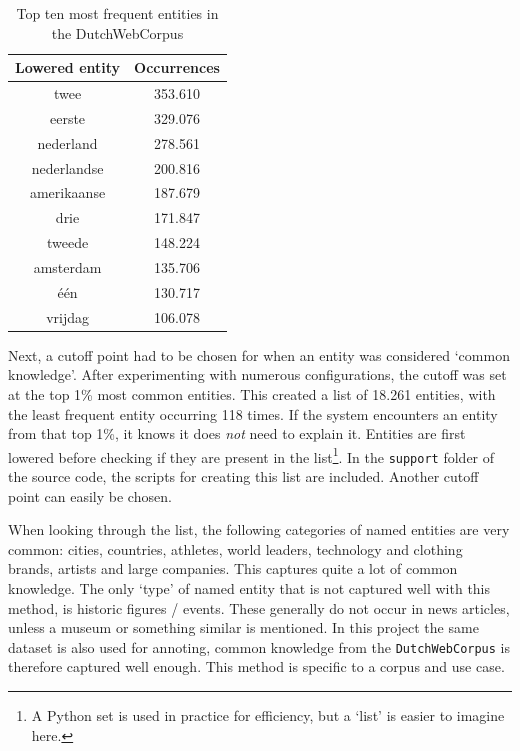 \documentclass[
10pt, %
a4paper, %
oneside, %
headinclude,footinclude, %
] {book}%
\begin{document}
\begin{table}[hbtp]\centering
  \caption{Top ten most frequent entities in the DutchWebCorpus\label{table:entity_counts}}
  \begin{tabular}{cc}
    Lowered entity & Occurrences \\
    \hline
    twee           & 353.610     \\
    eerste         & 329.076     \\
    nederland      & 278.561     \\
    nederlandse    & 200.816     \\
    amerikaanse    & 187.679     \\
    drie           & 171.847     \\
    tweede         & 148.224     \\
    amsterdam      & 135.706     \\
    één            & 130.717     \\
    vrijdag        & 106.078     \\
  \end{tabular}
\end{table}

Next, a cutoff point had to be chosen for when an entity was considered `common knowledge'.
After experimenting with numerous configurations, the cutoff was set at the top 1\% most common entities.
This created a list of 18.261 entities, with the least frequent entity occurring 118 times.
If the system encounters an entity from that top 1\%, it knows it does \textit{not} need to explain it.
Entities are first lowered before checking if they are present in the list\footnote{A Python set is used in practice for efficiency, but a `list' is easier to imagine here.}.
In the \verb+support+ folder of the source code, the scripts for creating this list are included.
Another cutoff point can easily be chosen.

When looking through the list, the following categories of named entities are very common: cities, countries, athletes, world leaders, technology and clothing brands, artists and large companies.
This captures quite a lot of common knowledge.
The only `type' of named entity that is not captured well with this method, is historic figures / events.
These generally do not occur in news articles, unless a museum or something similar is mentioned.
In this project the same dataset is also used for annoting, common knowledge from the \verb+DutchWebCorpus+ is therefore captured well enough.
This method is specific to a corpus and use case.
\end{document}
